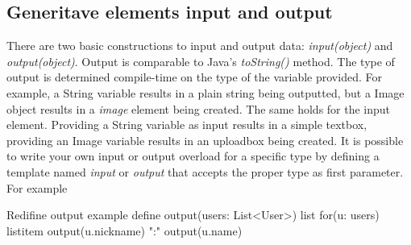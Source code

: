 \subsection{Generitave elements input and output}
There are two basic constructions to input and output data: \emph{input(object)} and \emph{output(object)}. Output is comparable to Java's \emph{toString()} method. The type of output is determined compile-time on the type of the variable provided. For example, a String variable results in a plain string being outputted, but a Image object results in a \emph{image} element being created. 
The same holds for the input element. Providing a String variable as input results in a simple textbox, providing an Image variable results in an uploadbox being created. 
It is possible to write your own input or output overload for a specific type by defining a template named \emph{input} or \emph{output} that accepts the proper type as first parameter. For example
\begin{webdsl}{Redifine output example}
define output(users: List<User>) {
	list {
		for(u: users) {
			listitem {
				output(u.nickname) ":" output(u.name)
			}
		}
	}
}
\end{webdsl}

